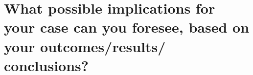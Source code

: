 \section{What possible implications for your case can you foresee, based on your outcomes/results/ conclusions?}
